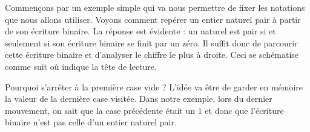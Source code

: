 Commençons par un exemple simple qui va nous permettre de fixer les notations que nous allons utiliser.
Voyons comment repérer un entier naturel pair à partir de son écriture binaire.
La réponse est évidente : un naturel est pair si et seulement si son écriture binaire se finit par un zéro.
Il suffit donc de parcourir cette écriture binaire et d'analyser le chiffre le plus à droite. Ceci se schématise comme suit où \head{} indique la tête de lecture.

\begin{multicols}{2}

%

\emptybox\emptybox%
\emptybox\emptybox

\phantom{%
	\emptybox\emptybox}%
	\head


\medskip %

\emptybox\emptybox%
\emptybox\emptybox

\phantom{%
	\emptybox\emptybox
	\emptybox}%
	\head


\medskip %

\emptybox\emptybox%
\emptybox\emptybox

\phantom{%
	\emptybox\emptybox
	\emptybox\emptybox}%
	\head


\vfill\null
\columnbreak

\medskip %

\emptybox\emptybox%
\emptybox\emptybox

\phantom{%
	\emptybox\emptybox
	\emptybox\emptybox\emptybox}%
	\head


\medskip %

\emptybox\emptybox%
\emptybox\emptybox

\phantom{%
	\emptybox\emptybox
	\emptybox\emptybox\emptybox\emptybox}%
	\head


\medskip %

\emptybox\emptybox%
\emptybox\emptybox

\phantom{%
	\emptybox\emptybox
	\emptybox\emptybox\emptybox\emptybox\emptybox}%
	\head

\vfill\null
\end{multicols}

\vspace{-1em}

Pourquoi s'arrêter à la première case vide ? L'idée va être de garder en mémoire la valeur de la dernière case visitée.
Dans notre exemple, lors du dernier mouvement, on sait que la case précédente était un $1$ et donc que l'écriture binaire n'est pas celle d'un entier naturel pair.
